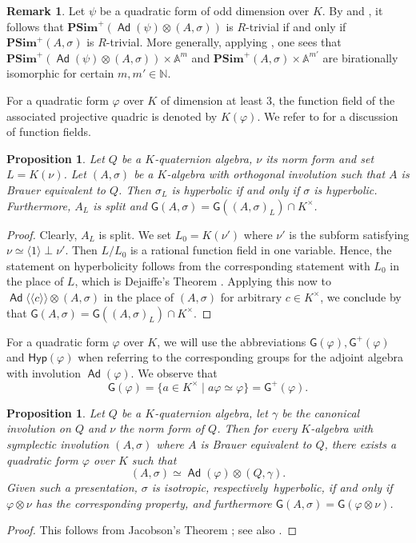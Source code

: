 \documentclass[twoside,11pt]{amsart}
\numberwithin{equation}{section}
\newtheorem{prop}[equation]{Proposition}
\theoremstyle{definition}
\newtheorem{rem}[equation]{Remark}
\newcommand{\vf}{\varphi}
\newcommand{\mg}[1]{{#1}^{\times}}
\newcommand{\s}{\sigma}
\newcommand{\nat}{\mathbb{N}}
\newcommand{\la}{\langle}
\newcommand{\ra}{\rangle}
\newcommand{\lla}{\la\!\la}
\newcommand{\rra}{\ra\!\ra}
\newcommand\Ad{\operatorname{\mathsf{Ad}}}
\newcommand{\G}{\mathsf{G}}
\newcommand{\Hyp}{\mathsf{Hyp}}
\begin{document}
\begin{rem}
    Let $\psi$ be a quadratic form of odd dimension over $K$.
    By  and , it follows that $\mathbf{PSim}^+(\Ad(\psi)\otimes(A,\s))$ is $R$-trivial if and only if $\mathbf{PSim}^+(A,\s)$ is $R$-trivial.
    More generally, applying \cite[Prop.~4.5]{Mer98}, one sees that $\mathbf{PSim}^+(\Ad(\psi)\otimes(A,\s))\times \mathbb{A}^m$ and $\mathbf{PSim}^+(A,\s)\times \mathbb{A}^{m'}$ are birationally isomorphic for certain $m,m'\in\nat$.
\end{rem}

For a quadratic form $\vf$ over $K$ of dimension at least $3$, the function field of the associated projective quadric is denoted by $K(\vf)$. 
We refer to \cite[Section 22]{EKM08} for a discussion of function fields.

\begin{prop}\label{simsplitreduction}
Let $Q$ be a $K$-quaternion algebra, $\nu$ its norm form and set $L=K(\nu)$.
Let $(A,\s)$ be a $K$-algebra with orthogonal involution such that $A$ is Brauer equivalent to $Q$.
Then $\s_L$ is hyperbolic if and only if $\s$ is hyperbolic.
Furthermore, $A_{L}$ is split and $\G(A,\s)=\G((A,\s)_{L})\cap \mg{K}$.
\end{prop}
\begin{proof}
    Clearly, $A_L$ is split.
    We set $L_0=K(\nu')$ where $\nu'$ is the subform satisfying $\nu\simeq \la 1\ra\perp\nu'$.
    Then $L/L_0$ is a rational function field in one variable.
    Hence, the statement on hyperbolicity follows from the corresponding statement with $L_0$ in the place of $L$, which is Dejaiffe's Theorem \cite{Dej01}.
    Applying this now to $\Ad\lla c\rra\otimes (A,\s)$ in the place of $(A,\s)$ for arbitrary $c\in\mg{K}$, we conclude by  that $\G(A,\s)=\G((A,\s)_{L})\cap \mg{K}$.
\end{proof}

For a quadratic form $\vf$ over $K$, we will use the abbreviations $\G(\vf), \G^+(\vf)$ and $\Hyp(\vf)$ when referring to the corresponding groups for the adjoint algebra with involution $\Ad(\vf)$.
We observe that 
\[\G(\vf)=\{a\in\mg{K}\mid a\vf\simeq \vf\}=\G^+(\vf).\]

\begin{prop}\label{Jacobson}
    Let $Q$ be a $K$-quaternion algebra, let $\gamma$ be the canonical involution on $Q$ and $\nu$ the norm form of $Q$.
    Then for every $K$-algebra with symplectic involution $(A,\s)$ where $A$ is Brauer equivalent to $Q$, there exists a quadratic form $\vf$ over $K$ such that 
    $$(A,\s)\simeq \Ad(\vf)\otimes (Q,\gamma).$$
    Given such a presentation, $\s$ is isotropic, respectively~hyperbolic, if and only if $\vf\otimes\nu$ has the corresponding property, and 
    furthermore $\G(A,\s)=\G(\vf\otimes\nu)$.
\end{prop}
\begin{proof}
    This follows from Jacobson's Theorem \cite{Jac40}; see also \cite[Theorem 10.1.1]{Scha85}.
\end{proof}
\end{document}

